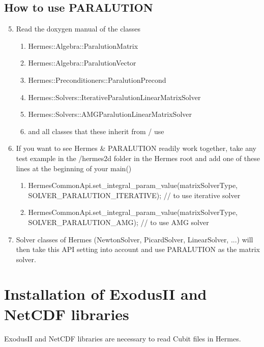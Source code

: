 \documentclass[a4paper,0pt,english]{sphinxmanual}
\begin{document}
\subsection{How to use PARALUTION}
\label{src/installation/matrix_solvers/paralution:how-to-use-paralution}\begin{enumerate}
\setcounter{enumi}{4}
\item {} 
Read the doxygen manual of the classes
\begin{enumerate}
\item {} 
Hermes::Algebra::ParalutionMatrix

\item {} 
Hermes::Algebra::ParalutionVector

\item {} 
Hermes::Preconditioners::ParalutionPrecond

\item {} 
Hermes::Solvers::IterativeParalutionLinearMatrixSolver

\item {} 
Hermes::Solvers::AMGParalutionLinearMatrixSolver

\item {} 
and all classes that these inherit from / use

\end{enumerate}

\item {} 
If you want to see Hermes \& PARALUTION readily work together, take any test example in the /hermes2d folder in the Hermes root and add one of these lines at the beginning of your main()
\begin{enumerate}
\item {} 
HermesCommonApi.set\_integral\_param\_value(matrixSolverType, SOLVER\_PARALUTION\_ITERATIVE); // to use iterative solver

\item {} 
HermesCommonApi.set\_integral\_param\_value(matrixSolverType, SOLVER\_PARALUTION\_AMG); // to use AMG solver

\end{enumerate}

\item {} 
Solver classes of Hermes (NewtonSolver, PicardSolver, LinearSolver, ...) will then take this API setting into account and use PARALUTION as the matrix solver.

\end{enumerate}


\section{Installation of ExodusII and NetCDF libraries}
\label{src/installation/exodusII_netcdf:installation-of-exodusii-and-netcdf-libraries}\label{src/installation/exodusII_netcdf::doc}
ExodusII and NetCDF libraries are necessary to read Cubit files in Hermes.
\end{document}
